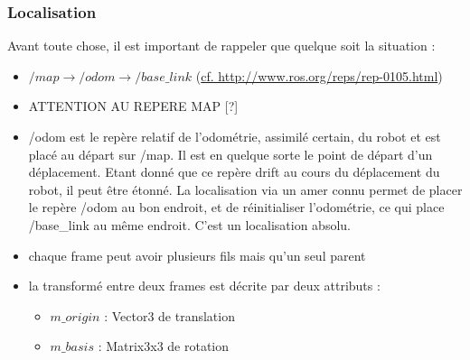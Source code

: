 \documentclass[10pt,a4paper]{article}
\begin{document}
\subsubsection{Localisation}
\label{sec:localision}

\noindent Avant toute chose, il est important de rappeler que quelque soit la situation :
\begin{itemize}
\item $/map \rightarrow /odom \rightarrow /base\_link $ (\url{cf. http://www.ros.org/reps/rep-0105.html})
\item ATTENTION AU REPERE MAP [?]
\item /odom est le repère relatif de l'odométrie, assimilé certain, du robot et est placé au départ sur /map. Il est en quelque sorte le point de départ d'un déplacement. Etant donné que ce repère drift au cours du déplacement du robot, il peut être étonné. La localisation via un amer connu permet de placer le repère /odom au bon endroit, et de réinitialiser l'odométrie, ce qui place /base\_link au même endroit. C'est un localisation absolu.
\item chaque frame peut avoir plusieurs fils mais qu'un seul parent
\item la transformé entre deux frames est décrite par deux attributs : 
  \begin{itemize}
  \item $m\_origin$ : Vector3 de translation 
  \item $m\_basis$ : Matrix3x3 de rotation
  \end{itemize}
\end{itemize}
\end{document}
